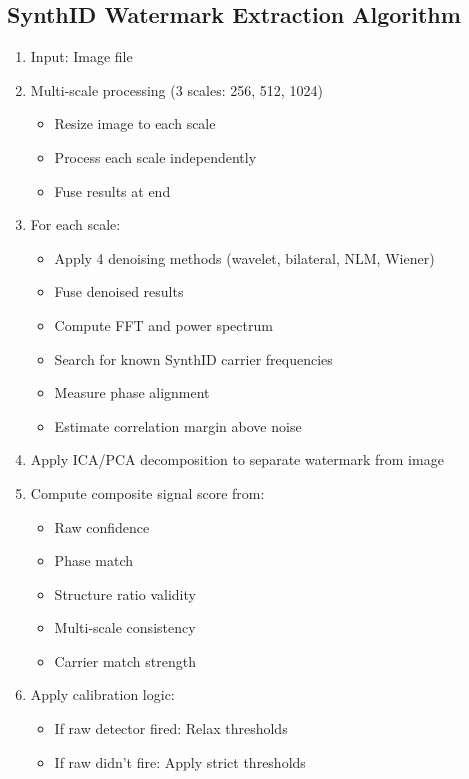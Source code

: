 \documentclass[12pt,a4paper]{book}
\begin{document}
\begin{itemize}
\section{SynthID Watermark Extraction Algorithm}

\begin{enumerate}
    \item Input: Image file
    
    \item Multi-scale processing (3 scales: 256, 512, 1024)
    \begin{itemize}
        \item Resize image to each scale
        \item Process each scale independently
        \item Fuse results at end
    \end{itemize}
    
    \item For each scale:
    \begin{itemize}
        \item Apply 4 denoising methods (wavelet, bilateral, NLM, Wiener)
        \item Fuse denoised results
        \item Compute FFT and power spectrum
        \item Search for known SynthID carrier frequencies
        \item Measure phase alignment
        \item Estimate correlation margin above noise
    \end{itemize}
    
    \item Apply ICA/PCA decomposition to separate watermark from image
    
    \item Compute composite signal score from:
    \begin{itemize}
        \item Raw confidence
        \item Phase match
        \item Structure ratio validity
        \item Multi-scale consistency
        \item Carrier match strength
    \end{itemize}
    
    \item Apply calibration logic:
    \begin{itemize}
        \item If raw detector fired: Relax thresholds
        \item If raw didn't fire: Apply strict thresholds
    \end{itemize}
    

\end{enumerate}
\end{itemize}
\end{document}
